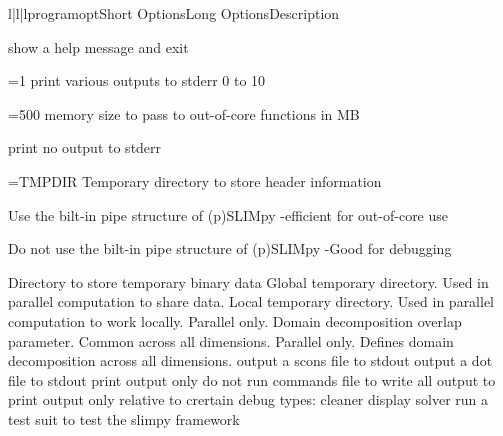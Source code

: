 \documentclass{manual}
\begin{document}
\begin{tableiii}{l|l|l}{programopt}{Short Options}{Long
Options}{Description}

   {}
              {show a help message and exit}
              
   {=1}
                        {print various outputs to stderr 0 to 10}
                        
   {=500}
                        {memory size to pass to out-of-core functions in MB}
                        
  				           {print no output to stderr}
  				           
   {=TMPDIR}
                        {Temporary directory to store header information}
                        
  			            {Use the bilt-in pipe structure of (p)SLIMpy -efficient for
  			            out-of-core use}
  			            
  						{Do not use the
  						bilt-in pipe structure of (p)SLIMpy -Good for debugging }
  						
  					    { Directory to store temporary binary data }
  						{Global temporary directory.  Used in parallel computation to share data.}
  					    { Local temporary directory.  Used in parallel computation to work
  					    locally.}
  				       {Parallel only. Domain decomposition overlap parameter.
                        Common across all dimensions.}
  						{Parallel only. Defines domain decomposition across all
                         dimensions. }
  						{output a scons file to stdout}
  						{output a dot file to stdout}
  						{print output only do not run commands}
  						{file to write all output to}
  						{print output only relative to crertain debug types:
                         cleaner display solver}
  		                 {run a test suit to test the slimpy framework}
	
\end{tableiii}
\end{document}
